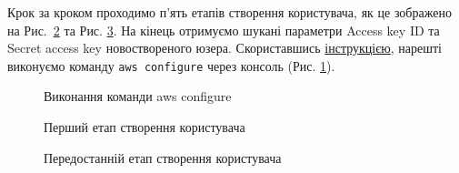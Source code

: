 \documentclass[a4paper,14pt]{extarticle} %
\begin{document}
Крок за кроком проходимо п'ять етапів створення користувача, як це зображено на Рис.~\ref{fig:creation step1} та 
Рис. \ref{fig:creation step4}. На кінець отримуємо шукані параметри Access key ID та Secret access key новоствореного
юзера. Скориставшись \href{https://docs.aws.amazon.com/cli/latest/userguide/cli-configure-files.html}{інструкцією}, 
нарешті виконуємо команду \texttt{aws configure} через консоль (Рис. \ref{fig:aws configure}).

\begin{figure}[H]
    \caption{Виконання команди aws configure}
    \label{fig:aws configure}
\end{figure}

\begin{figure}[H]
    \caption{Перший етап створення користувача}
    \label{fig:creation step1}
\end{figure}

\begin{figure}[H]
    \caption{Передостанній етап створення користувача}
    \label{fig:creation step4}
\end{figure}
\end{document}
